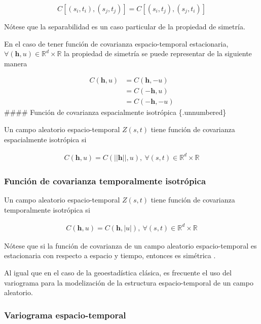 \documentclass[
]{book}
\begin{document}
\[
C[(s_i,t_i),(s_j,t_j)]=C[(s_i,t_j),(s_j,t_i)]
\]

Nótese que la separabilidad es un caso particular de la propiedad de simetría.

En el caso de tener función de covarianza espacio-temporal estacionaria, \(\forall (\boldsymbol h,u)\in \mathbb{R}^d \times \mathbb{R}\) la propiedad de simetría se puede representar de la siguiente manera

\[
\begin{align*}
C(\boldsymbol h, u)&=C(\boldsymbol h,-u)\\
&=C(-\boldsymbol h, u)\\
&=C(-\boldsymbol h, -u)
\end{align*}
\]
\#\#\#\# Función de covarianza espacialmente isotrópica \{.unnumbered\}

Un campo aleatorio espacio-temporal \(Z(s,t)\) tiene función de covarianza espacialmente isotrópica si

\[
\begin{align*}
C(\boldsymbol h,u)=C(||\boldsymbol h||,u), \ \forall(s,t) \in \mathbb{R}^d \times \mathbb{R}
\end{align*}
\]

\hypertarget{funciuxf3n-de-covarianza-temporalmente-isotruxf3pica}{%
\subsubsection*{Función de covarianza temporalmente isotrópica}\label{funciuxf3n-de-covarianza-temporalmente-isotruxf3pica}}

Un campo aleatorio espacio-temporal \(Z(s,t)\) tiene función de covarianza temporalmente isotrópica si

\[
\begin{align*}
C(\boldsymbol h,u)=C(\boldsymbol h,|u|), \ \forall(s,t) \in \mathbb{R}^d \times \mathbb{R}
\end{align*}
\]

Nótese que si la función de covarianza de un campo aleatorio espacio-temporal es estacionaria con respecto a espacio y tiempo, entonces es simétrica \citep{montero}.

Al igual que en el caso de la geoestadística clásica, es frecuente el uso del variograma para la modelización de la estructura espacio-temporal de un campo aleatorio.

\hypertarget{variograma-espacio-temporal}{%
\subsubsection*{Variograma espacio-temporal}\label{variograma-espacio-temporal}}
\end{document}
